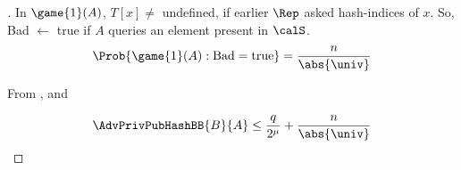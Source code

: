 \begin{proof}[]
In $\game{1}(A)$, $T[x]\neq$ undefined, if earlier $\Rep$ asked hash-indices of $x$. So,  Bad $\gets$ true if $A$ queries an element present in $\calS$. 
\begin{equation}
\Prob{\game{1}(A):\mathrm{Bad} = \mathrm{true}} = \frac{n}{\abs{\univ}}\label{eq:4T3}
\end{equation}

From ,  and 

\begin{equation}
\AdvPrivPubHashBB{B}{A} \leq  \frac{q}{2^\mu} + \frac{n}{\abs{\univ}}
\end{equation}

\end{proof}
